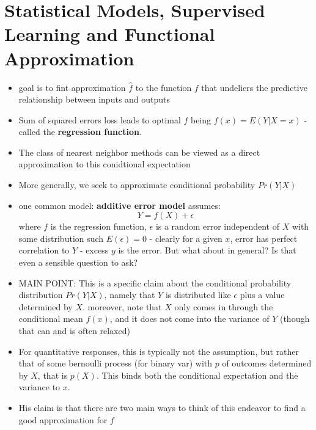 \section{Statistical Models, Supervised Learning and Functional Approximation}
\begin{itemize}
  \item goal is to fint approximation $\hat{f}$ to the function $f$ that undeliers the predictive relationship between inputs and outputs
  \item Sum of squared errors loss leads to optimal $f$ being $f(x) = E(Y | X=x)$ - called the {\bf regression function}.
  \item The class of nearest neighbor methods can be viewed as a direct approximation to this conidtional expectation
  \item More generally, we seek to approximate conditional probability $Pr(Y | X)$
  \item one common model: {\bf additive error model}
    \subitem assumes:
    $$ Y = f(X) + \epsilon$$
    where $f$ is the regression function, $\epsilon$ is a random error independent of $X$ with some distribution such $E(\epsilon) = 0$
     - clearly for a given $x$, error has perfect correlation to $Y$ - excess $y$ is the error. But what about in general? Is that even a sensible question to ask?
  \item MAIN POINT: This is a specific claim about the conditional probability distribution $Pr(Y | X)$, namely that $Y$ is distributed like $\epsilon$ plus a value determined by $X$.
    \subitem moreover, note that $X$ only comes in through the conditional mean $f(x)$, and it does not come into the variance of $Y$ (though that can and is often relaxed)
  \item For quantitative responses, this is typically not the assumption, but rather that of some bernoulli process (for binary var) with $p$ of outcomes determined by $X$, that is $p(X)$. This binds both the conditional expectation and the variance to $x$.
  \item His claim is that there are two main ways to think of this endeavor to find a good approximation for $f$

\end{itemize}
